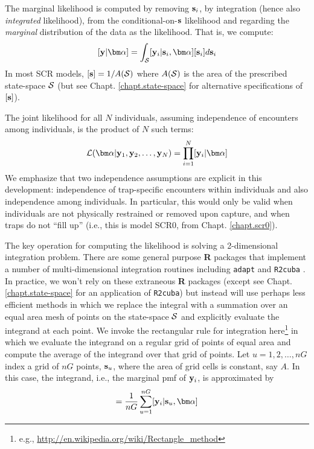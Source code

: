 The marginal likelihood is computed by removing
${\bf s}_{i}$, by integration (hence also {\it integrated} likelihood), from the conditional-on-${\bf s}$
likelihood and regarding the {\it marginal} distribution of the data
as 
the likelihood. That
is, we compute:
\[
  [{\bf y}|{\bm \alpha}] = 
\int_{{\cal S}}  [ {\bf y}_{i} |{\bf s}_{i}, {\bm \alpha}] [{\bf s}_{i}] d{\bf s}_{i}
\]
In most SCR models, $[{\bf s}] = 1/A({\cal S})$ where $A({\cal S})$ is
the area of the prescribed state-space ${\cal S}$ (but see Chapt. \ref{chapt.state-space} for
alternative specifications of $[{\bf s}]$).

The joint likelihood for all $N$ individuals, assuming independence of
encounters among individuals, is the product of $N$ such terms:
\[
{\cal L}({\bm \alpha} | {\bf y}_{1},{\bf y}_{2},\ldots, {\bf y}_{N}) =     \prod_{i=1}^{N}
[{\bf y}_{i}|{\bm \alpha}]
\]
We emphasize that two independence assumptions are explicit in this
development: independence of trap-specific encounters within
individuals and also independence among individuals. In particular,
this would only be valid when individuals are not physically
restrained or removed upon capture, and when traps do not ``fill up''
(i.e., this is model SCR0, from Chapt. \ref{chapt.scr0}).

The key operation for computing the likelihood is solving a
2-dimensional integration problem. There are some general purpose {\bf
  R} packages that implement a number of 
 multi-dimensional integration routines
including \mbox{\tt adapt} \citep{genz_etal:2007} and \mbox{\tt R2cuba}
\citep{hahn_etal:2011}.  In practice, we won't rely
on these extraneous {\bf R} packages (except see
Chapt. \ref{chapt.state-space} for an application of \mbox{\tt R2cuba})
but instead will use perhaps less
efficient methods in which we replace the integral with a summation
over an equal area mesh of points on the state-space ${\cal S}$ and explicitly
evaluate the integrand at each point. We invoke the rectangular rule
for integration here\footnote{e.g., 
\url{http://en.wikipedia.org/wiki/Rectangle_method}
} in which we
evaluate the
integrand on a regular grid of points of equal area and compute the
average of
the integrand over that grid of points. 
Let $u=1,2,\ldots,nG$ index a grid of
$nG$ points, ${\bf s}_{u}$,  where the area of grid cells is
constant, say $A$.
In this case, the integrand, i.e., the marginal pmf of 
${\bf y}_{i}$, is approximated by  
\begin{equation}
         [{\bf y}_{i}|{\bm \alpha}] = \frac{1}{nG} \sum_{u=1}^{nG}  [ {\bf
            y}_{i} |{\bf s}_u, {\bm \alpha}]
\label{mle.eq.intlik}
\end{equation}

